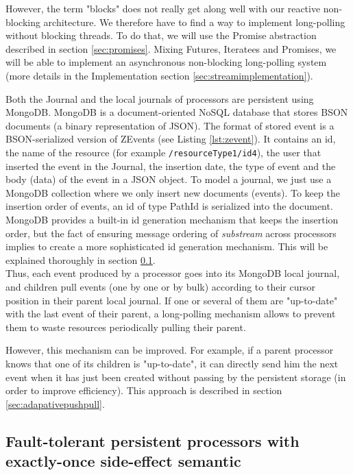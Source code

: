 However, the term "blocks" does not really get along well with our reactive non-blocking architecture. We therefore have to find a way to implement long-polling without blocking
threads. To do that, we will use the Promise abstraction described in section \ref{sec:promises}. Mixing Futures, Iteratees and Promises, we will be able to implement
an asynchronous non-blocking long-polling system (more details in the Implementation section \ref{sec:streamimplementation}).

Both the Journal and the local journals of processors are persistent using MongoDB. MongoDB is a document-oriented NoSQL database  that stores BSON documents (a binary representation of JSON). The format of stored event is a BSON-serialized version of ZEvents (see Listing \ref{lst:zevent}). It contains an id, the name of the resource (for example \verb|/resourceType1/id4|), the user that inserted the event in the Journal, the insertion date, the type of event and the body (data) of the event in a JSON object. To model a journal, we just use a MongoDB collection where we only insert new documents (events). To keep the insertion order of events, an id of type PathId is serialized
into the document. MongoDB provides a built-in id generation mechanism that keeps the insertion order, but the fact of ensuring message ordering of \textit{substream} across processors implies to create a more sophisticated id generation mechanism. This will be explained thoroughly in section \ref{sec:substreamproblem}.
\\

Thus, each event produced by a processor goes into its MongoDB local journal, and children pull events (one by one or by bulk) according to their cursor position in their parent
local journal. If one or several of them are "up-to-date" with the last event of their parent, a long-polling mechanism allows to prevent them to waste resources periodically pulling their parent.

However, this mechanism can be improved. For example, if a parent processor knows that one of its children is "up-to-date", it can directly send him the next event when it has just been created without passing by the persistent storage (in order to improve efficiency). This approach is described in section \ref{sec:adapativepushpull}.

\subsection{Fault-tolerant persistent processors with exactly-once side-effect semantic}
\label{sec:substreamproblem}

